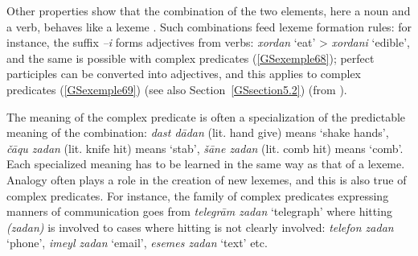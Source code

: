 \documentclass[output=paper
	        ,collection
	        ,collectionchapter
 	        ,biblatex
                ,babelshorthands
                ,newtxmath
                ,draftmode
                ,colorlinks, citecolor=brown
]{langscibook}
\begin{document}
{	\label{GSexemple67b}
\zl

Other properties show that the combination of the two elements, here a noun and a verb, behaves like a lexeme \citep{bonami2010persian}. Such combinations feed lexeme formation rules: for instance, the suffix \emph{–i} forms adjectives from verbs: \emph{xordan} `eat' > \emph{xordani} `edible', and the same is possible with complex predicates (\ref{GSexemple68}); perfect participles can be converted into adjectives, and this applies to complex predicates (\ref{GSexemple69}) (see also Section~\ref{GSsection5.2}) (from \citealt[5]{bonami2010persian}).

\eal 
	\label{GSexemple68} 
    \label{GSexemple68a}
		
    \label{GSexemple68b}
\zl

\eal
	\label{GSexemple69} 
	\label{GSexemple69a}
		
	\label{GSexemple69b}
\zl

The meaning of the complex predicate is often a specialization of the predictable meaning of the combination: \emph{dast d\=adan} (lit. hand give) means `shake hands', \emph{\v c\=aqu zadan} (lit. knife hit) means `stab', \emph{\v s\=ane zadan} (lit. comb hit) means `comb'. Each specialized meaning has to be learned in the same way as that of a lexeme. Analogy often plays a role in the creation of new lexemes, and this is also true of complex predicates. For instance, the family of complex predicates expressing manners of communication goes from \emph{telegr\=am zadan} `telegraph' where hitting \emph{(zadan)} is involved to cases where hitting is not clearly involved: \emph{telefon zadan} `phone’, \emph{imeyl zadan} `email', \emph{esemes zadan} `text' etc.   

}
\end{document}
